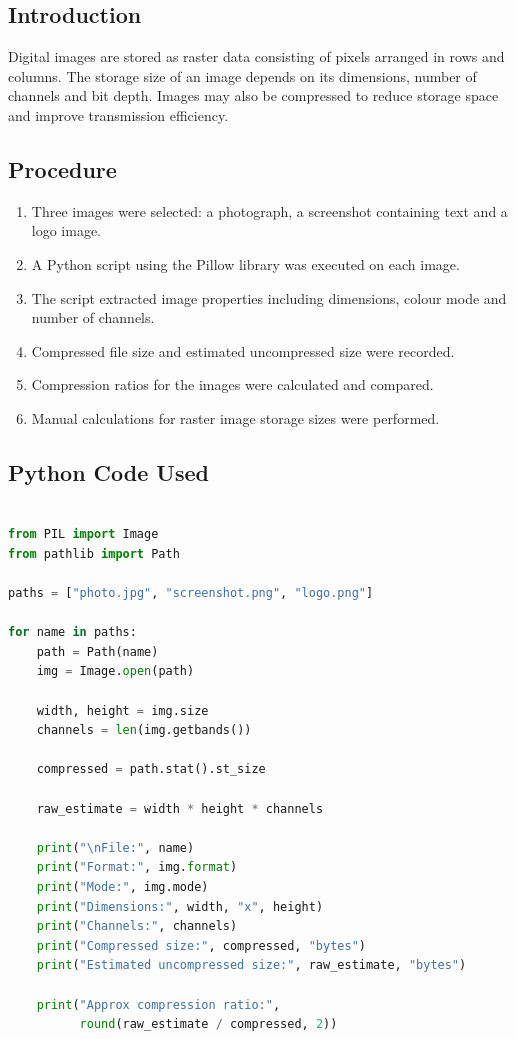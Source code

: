 \documentclass[12pt,a4paper]{article}
\begin{document}
\subsection{Introduction}

Digital images are stored as raster data consisting of pixels arranged in rows and columns. The storage size of an image depends on its dimensions, number of channels and bit depth. Images may also be compressed to reduce storage space and improve transmission efficiency.

\subsection{Procedure}

\begin{enumerate}
    \item Three images were selected: a photograph, a screenshot containing text and a logo image.
    
    \item A Python script using the Pillow library was executed on each image.
    
    \item The script extracted image properties including dimensions, colour mode and number of channels.
    
    \item Compressed file size and estimated uncompressed size were recorded.
    
    \item Compression ratios for the images were calculated and compared.
    
    \item Manual calculations for raster image storage sizes were performed.
\end{enumerate}

\subsection{Python Code Used}

\begin{lstlisting}[language=Python, basicstyle=\ttfamily\small, frame=single]

from PIL import Image
from pathlib import Path

paths = ["photo.jpg", "screenshot.png", "logo.png"]

for name in paths:
    path = Path(name)
    img = Image.open(path)

    width, height = img.size
    channels = len(img.getbands())

    compressed = path.stat().st_size

    raw_estimate = width * height * channels

    print("\nFile:", name)
    print("Format:", img.format)
    print("Mode:", img.mode)
    print("Dimensions:", width, "x", height)
    print("Channels:", channels)
    print("Compressed size:", compressed, "bytes")
    print("Estimated uncompressed size:", raw_estimate, "bytes")

    print("Approx compression ratio:",
          round(raw_estimate / compressed, 2))

\end{lstlisting}
\end{document}
